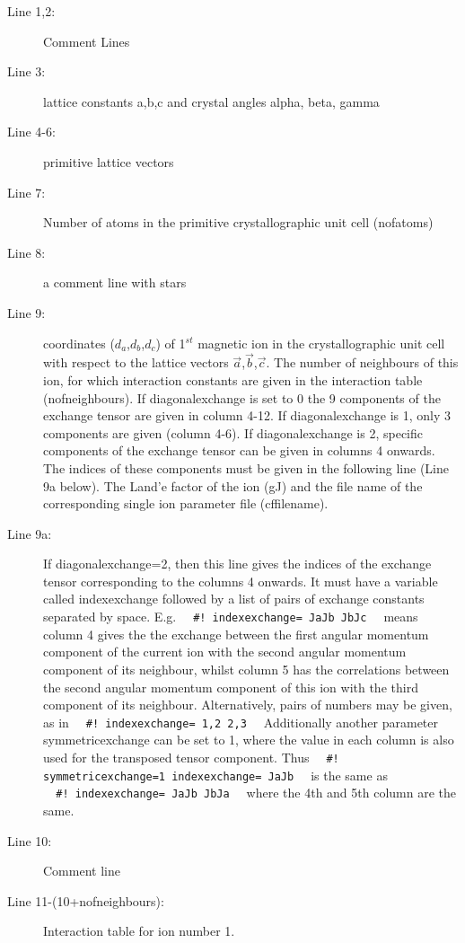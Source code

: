 \begin{description}
\item [Line 1,2:] Comment Lines
\item [Line 3:] lattice constants a,b,c and crystal angles alpha, beta, gamma 
\item [Line 4-6:] primitive lattice vectors
\item [Line 7:] Number of atoms in the primitive crystallographic unit cell ({\prg nofatoms})
\item [Line 8:] a comment line with stars
\item [Line 9:] coordinates  ($d_a$,$d_b$,$d_c$) of 1$^{st}$ magnetic ion in the crystallographic unit cell  with
respect to the lattice vectors $\vec a$,$\vec b$,$\vec c$. The number of neighbours of this 
ion, for which interaction constants are given in the interaction table (nofneighbours). 
If {\prg diagonalexchange}
is set to 0 the 9 components of the exchange tensor are given in column 4-12. 
If {\prg diagonalexchange}
 is 1, only 3 components are given (column 4-6).
If {\prg diagonalexchange}
 is 2, specific components of the exchange tensor can be given in columns 4 onwards. The indices of these components
 must be given in the following line (Line 9a below).
The Land'e factor of the ion (gJ) and the file name of the corresponding single ion
parameter file (cffilename).
\item [Line 9a:]  If {\prg diagonalexchange=2}, then this line gives the indices of the exchange tensor corresponding to 
 the columns 4 onwards. It must have a variable called {\prg indexexchange} followed by a list of pairs of exchange 
 constants separated by space. E.g. \verb|  #! indexexchange= JaJb JbJc  | means column 4 gives the the exchange between the
 first angular momentum component of the current ion with the second angular momentum component of its neighbour, whilst 
 column 5 has the correlations between the second angular momentum component of this ion with the third component of its
 neighbour. Alternatively, pairs of numbers may be given, as in \verb|  #! indexexchange= 1,2 2,3  |
 Additionally another parameter {\prg symmetricexchange} can be set to 1, where the value in each column is also used 
 for the transposed tensor component. Thus \verb|  #! symmetricexchange=1 indexexchange= JaJb  | is the same as \\
 \verb|  #! indexexchange= JaJb JbJa  | where the 4th and 5th column are the same.
\item [Line 10:]  Comment line
\item [Line 11-(10+nofneighbours):] Interaction table for ion number 1.   

\end{description}
